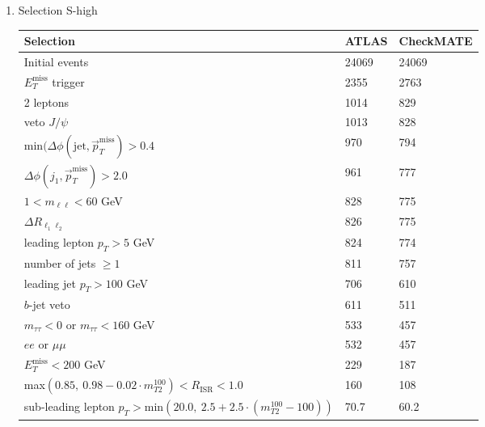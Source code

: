 \documentclass[12pt,fleqn]{article}
\begin{document}
\begin{enumerate}
\newpage

\item{Selection S-high}

\begin{table}[h!] \begin{center}
 \renewcommand*{\arraystretch}{1.2}
 \begin{tabular}{l|p{3cm}|p{3cm}} \toprule
  Selection                                                                       & ATLAS    & CheckMATE       \\ \midrule
  Initial events                                                                  & 24069     &  24069          \\
  $E_T^\mathrm{miss}$ trigger                                                     & 2355      &  2763 \\
  2 leptons                                                                       & 1014     &   829\\
  veto $J/\psi$                                                                   & 1013     &   828 \\ 
  min$(\Delta\phi(\mathrm{jet}, \vec{p}_T^\mathrm{miss})>0.4$                     & 970     &    794\\   
  $\Delta\phi(j_1, \vec{p}_T^\mathrm{miss})>2.0$                                  & 961     &    777\\
  $1 < m_{\ell \ell} < 60$ GeV                                                    & 828     &    775\\
  $\Delta R_{\ell_1 \ell_2}$                                                      & 826     &    775\\
  leading lepton $p_T > 5$ GeV                                                    & 824     &    774\\
  number of jets $\geq 1$                                                         & 811     &    757\\
  leading jet $p_T > 100 $ GeV                                                    & 706     &    610\\ 
  $b$-jet veto                                                                    & 611     &    511\\
  $m_{\tau\tau} < 0$ or $m_{\tau\tau} < 160$ GeV                                  & 533     &    457\\
  $ee$ or $\mu\mu$                                                                & 532     &    457\\
  $E_T^\mathrm{miss} < 200$ GeV                                                   & 229     &    187   \\
  max$(0.85,\ 0.98 - 0.02 \cdot m_{T2}^{100}) < R_\mathrm{ISR} < 1.0$             & 160      &    108   \\
  sub-leading lepton $p_T > \mathrm{min}(20.0,\ 2.5 + 2.5 \cdot (m_{T2}^{100} - 100))$ &   70.7    & 60.2  \\
  \bottomrule
 \end{tabular}\end{center}
\end{table} 
 

\end{enumerate}
\end{document}
